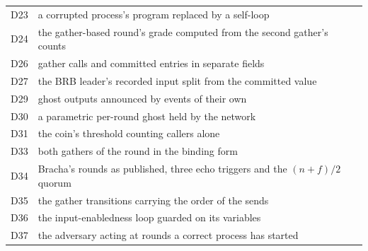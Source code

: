\begin{center}
\begin{tabular}{lp{12cm}}
D23 & a corrupted process's program replaced by a self-loop \\
D24 & the gather-based round's grade computed from the second gather's counts \\
D26 & gather calls and committed entries in separate fields \\
D27 & the BRB leader's recorded input split from the committed value \\
D29 & ghost outputs announced by events of their own \\
D30 & a parametric per-round ghost held by the network \\
D31 & the coin's threshold counting callers alone \\
D33 & both gathers of the round in the binding form \\
D34 & Bracha's rounds as published, three echo triggers and the $(n+f)/2$ quorum \\
D35 & the gather transitions carrying the order of the sends \\
D36 & the input-enabledness loop guarded on its variables \\
D37 & the adversary acting at rounds a correct process has started \\
\hline
\end{tabular}
\end{center}
